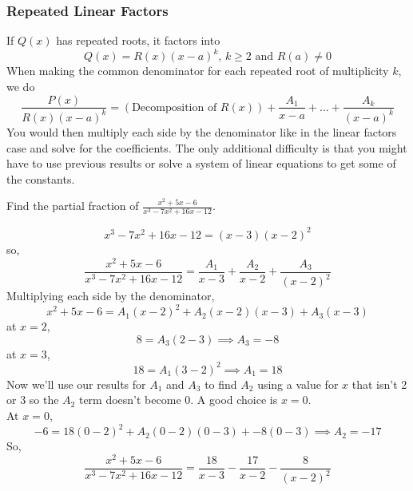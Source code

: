 \subsubsection{Repeated Linear Factors}
\noindent
If $Q(x)$ has repeated roots, it factors into
\begin{equation*}
	Q(x) = R(x)(x-a)^k\text{, }k \geq 2\text{ and }R(a) \neq 0
\end{equation*}
When making the common denominator for each repeated root of multiplicity $k$, we do
\begin{equation*}
	\frac{P(x)}{R(x)(x-a)^k} = \left(\text{Decomposition of }R(x)\right) + \frac{A_1}{x-a}+\ldots+\frac{A_k}{(x-a)^k}
\end{equation*}
You would then multiply each side by the denominator like in the linear factors case and solve for the coefficients. The only additional difficulty is that you might have to use previous results or solve a system of linear equations to get some of the constants.

\begin{example}
	Find the partial fraction of $\frac{x^2+5x-6}{x^3-7x^2+16x-12}$.
\end{example}
\begin{equation*}
	x^3-7x^2+16x-12 = (x-3)(x-2)^2
\end{equation*}
so,
\begin{equation*}
	\frac{x^2+5x-6}{x^3-7x^2+16x-12} =  \frac{A_1}{x-3} + \frac{A_2}{x-2} + \frac{A_3}{(x-2)^2} 
\end{equation*}
Multiplying each side by the denominator,
\begin{equation*}
	x^2+5x-6 = A_1(x-2)^2 + A_2(x-2)(x-3) + A_3(x-3)
\end{equation*}
at $x=2$,
\begin{equation*}
	8 = A_3(2-3) \implies A_3 = -8
\end{equation*}
at $x=3$,
\begin{equation*}
	18 = A_1(3-2)^2 \implies A_1 = 18
\end{equation*}
Now we'll use our results for $A_1$ and $A_3$ to find $A_2$ using a value for $x$ that isn't 2 or 3 so the $A_2$ term doesn't become 0. A good choice is $x=0$.\\
At $x=0$,
\begin{equation*}
	-6 = 18(0-2)^2 + A_2(0-2)(0-3) + -8(0-3) \implies A_2 = -17
\end{equation*}
So,
\begin{equation*}
	\frac{x^2+5x-6}{x^3-7x^2+16x-12} = \frac{18}{x-3} - \frac{17}{x-2} - \frac{8}{(x-2)^2}
\end{equation*}